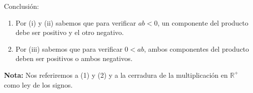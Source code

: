 \documentclass[11pt]{article}
\newcommand{\R}{\mathbb{R}}
\begin{document}
\begin{enumerate}[label=\alph*)]
    Conclusión:
    \begin{enumerate}[label=\arabic*)]
        \item Por (i) y (ii) sabemos que para verificar $ab<0$, un componente del producto debe ser positivo y el otro negativo.
        \item Por (iii) sabemos que para verificar $0<ab$, ambos componentes del producto deben ser positivos o ambos negativos.
    \end{enumerate}

    \textbf{Nota:} Nos referiremos a (1) y (2) y a la cerradura de la multiplicación en $\R^+$ como ley de los signos.    

\end{enumerate}
\end{document}
